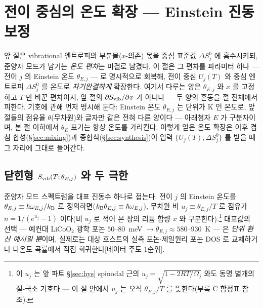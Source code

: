 \section{전이 중심의 온도 확장 --- Einstein 진동 보정}\label{sec:einstein}

앞 절은 vibrational 엔트로피의 부분몰($x$-의존) 몫을 중심 표준값 $\Delta S^0_j$ 에 흡수시키되, 준양자 모드가
남기는 \emph{온도 편차}는 미결로 남겼다. 이 절은 그 편차를 파라미터 하나 --- 전이 $j$ 의 Einstein 온도
$\theta_{E,j}$ --- 로 명시적으로 회복해, 전이 중심 $U_j(T)$ 와 중심 엔트로피 $\Delta S^0_j$ 를 온도로
\emph{자기완결하게} 확장한다. 여기서 다루는 양은 $\theta_{E,j}$ 와 $x$ 를 고정하고 $T$ 만 바꾼 편차이지, 앞
절의 $\partial S_{\mathrm{vib}}/\partial x$ 가 아니다 --- 두 양의 혼동을 절 전체에서 피한다. 기호에 관해 먼저 명시해
둔다: Einstein 온도 $\theta_{E,j}$ 는 단위가 K 인 온도로, 앞 절들의 점유율 $\theta$(무차원)와 글자만 같은
전혀 다른 양이다 --- 아래첨자 $E$ 가 구분자이며, 본 절 이하에서 $\theta_E$ 표기는 항상 온도를 가리킨다.
이렇게 얻은 온도 확장은 이후
겹침 합성(\S\ref{sec:mixing})과 종합식(\S\ref{sec:synthesis})이 입력 $\{U_j(T),\Delta S^0_j\}$ 를 받을 때 그
자리에 그대로 들어간다.

\subsection{닫힌형 $S_{\mathrm{vib}}(T;\theta_{E,j})$ 와 두 극한}\label{ssec:einstein-closed}
준양자 모드 스펙트럼을 대표 진동수 하나로 접는다. 전이 $j$ 의 Einstein 온도를 $\theta_{E,j}\equiv\hbar
\omega_{E,j}/k_{\mathrm B}$ 로 정의하면($k_{\mathrm B}\theta_{E,j}\equiv\hbar\omega_{E,j}$), 무차원 비 $u_j\equiv\theta_{E,j}/T$ 로
점유가 $n=1/(e^{u_j}-1)$ 이다(비 $u_j$ 로 적어 본 장의 리튬 함량 $x$ 와 구분한다).\footnote{이 $u_j$ 는
앞 파트 \S\ref{sec:hys} spinodal 근의 $u_j=\sqrt{1-2RT/\Omega_j}$ 와도 동명 별개의 절-국소 기호다 --- 이 절
안에서 $u_j$ 는 오직 $\theta_{E,j}/T$ 를 뜻한다(부록 C 함정표 참조).} 대표값의 선택 --- 예컨대
LiCoO$_2$ 광학 포논 $50$--$80$~meV $\to\theta_{E,j}\approx580$--$930$~K --- 은 \emph{단위 환산 예시일 뿐}이며,
실제로는 대상 호스트의 실측 포논$\cdot$제일원리 포논 DOS \cite{jpcc2021} 로 교체하거나 다온도 곡률에서 직접
회귀한다[데이터-주도 1순위].

